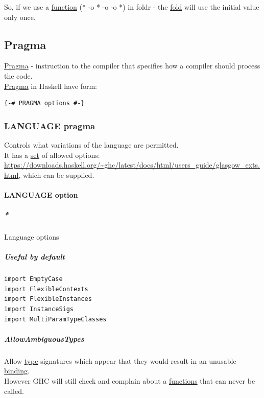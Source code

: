\documentclass[11pt]{article}
\begin{document}
So, if we use a \hyperref[orgeb5cddb]{function} (* -o * -o -o *) in foldr - the \hyperref[orgebf2b48]{fold} will use the initial value only once.\\

\subsection{\label{orga9befb0}Pragma}
\label{sec:orgf53249f}
\hyperref[orga9befb0]{Pragma} - instruction to the compiler that specifies how a compiler should process the code.\\
\hyperref[orga9befb0]{Pragma} in Haskell have form:\\
\begin{verbatim}
{-# PRAGMA options #-}
\end{verbatim}

\subsubsection{\label{org03c5afa}LANGUAGE pragma}
\label{sec:org1e9e67f}
Controls what variations of the language are permitted.\\
It has a \hyperref[orgbed80ba]{set} of allowed options: \url{https://downloads.haskell.org/\~ghc/latest/docs/html/users\_guide/glasgow\_exts.html}, which can be supplied.\\

\paragraph{\label{org117158e}LANGUAGE option}
\label{sec:orgc393e8b}

\subparagraph{\emph{*}}
\label{sec:org8eb9142}

\label{orgc60240b}Language options\\

\subparagraph{Useful by default}
\label{sec:org7360eb3}
\begin{verbatim}
import EmptyCase
import FlexibleContexts
import FlexibleInstances
import InstanceSigs
import MultiParamTypeClasses
\end{verbatim}

\subparagraph{\label{org191b05f}AllowAmbiguousTypes}
\label{sec:org443bcbc}
Allow \hyperref[org4fbaeb8]{type} signatures which appear that they would result in an unusable \hyperref[org45a7ea1]{binding}.\\
However GHC will still check and complain about a \hyperref[org66c5288]{functions} that can never be called.\\
\end{document}
